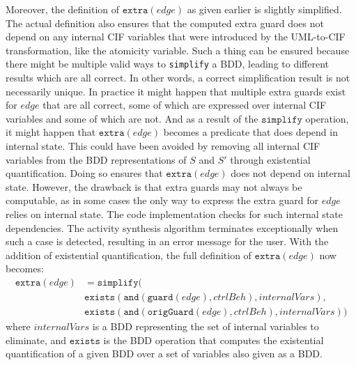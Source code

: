 \documentclass{article}
\theoremstyle{definition}
\begin{document}
Moreover, the definition of $\texttt{extra}(\mathit{edge})$ as given earlier is slightly simplified.
The actual definition also ensures that the computed extra guard does not depend on any internal CIF variables that were introduced by the UML-to-CIF transformation, like the atomicity variable.
Such a thing can be ensured because there might be multiple valid ways to \texttt{simplify} a BDD, leading to different results which are all correct.
In other words, a correct simplification result is not necessarily unique.
In practice it might happen that multiple extra guards exist for $\mathit{edge}$ that are all correct, some of which are expressed over internal CIF variables and some of which are not.
And as a result of the $\texttt{simplify}$ operation, it might happen that $\texttt{extra}(\mathit{edge})$ becomes a predicate that does depend in internal state.
This could have been avoided by removing all internal CIF variables from the BDD representations of $S$ and $S'$ through existential quantification. 
Doing so ensures that $\texttt{extra}(\mathit{edge})$ does not depend on internal state. 
However, the drawback is that extra guards may not always be computable, as in some cases the only way to express the extra guard for $\mathit{edge}$ relies on internal state.
The code implementation checks for such internal state dependencies.
The activity synthesis algorithm terminates exceptionally when such a case is detected, resulting in an error message for the user.
With the addition of existential quantification, the full definition of $\texttt{extra}(\mathit{edge})$ now becomes:
\begin{equation*}
	\begin{split}
		\texttt{extra}(\mathit{edge}) &= \texttt{simplify}( \\
			&\texttt{exists}(\texttt{and}(\texttt{guard}(\mathit{edge}), \mathit{ctrlBeh}), \mathit{internalVars}), \\
			&\texttt{exists}(\texttt{and}(\texttt{origGuard}(\mathit{edge}), \mathit{ctrlBeh}), \mathit{internalVars}))
	\end{split}
\end{equation*}
where $\mathit{internalVars}$ is a BDD representing the set of internal variables to eliminate, and $\texttt{exists}$ is the BDD operation that computes the existential quantification of a given BDD over a set of variables also given as a BDD.
\end{document}
